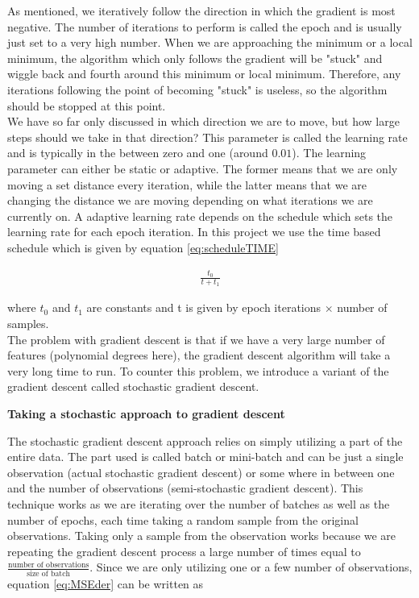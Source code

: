 \documentclass[12pt,a4paper]{article}
\begin{document}
\noindent As mentioned, we iteratively follow the direction in which the gradient is most negative. The number of iterations to perform is called the epoch and is usually just set to a very high number. When we are approaching the minimum or a local minimum, the algorithm which only follows the gradient will be "stuck" and wiggle back and fourth around this minimum or local minimum. Therefore, any iterations following the point of becoming "stuck" is useless, so the algorithm should be stopped at this point.
\\
We have so far only discussed in which direction we are to move, but how large steps should we take in that direction? This parameter is called the learning rate and is typically in the between zero and one (around $0.01$). The learning parameter can either be static or adaptive. The former means that we are only moving a set distance every iteration, while the latter means that we are changing the distance we are moving depending on what iterations we are currently on. A adaptive learning rate depends on the schedule which sets the learning rate for each epoch iteration. In this project we use the time based schedule which is given by equation \ref{eq:scheduleTIME}

\begin{equation}\label{eq:scheduleTIME}
\begin{aligned}
\frac{t_0}{t + t_1}
\end{aligned}
\end{equation}

\noindent where $t_0$ and $t_1$ are constants and t is given by epoch iterations $\times$ number of samples. 
\\
The problem with gradient descent is that if we have a very large number of features (polynomial degrees here), the gradient descent algorithm will take a very long time to run. To counter this problem, we introduce a variant of the gradient descent called stochastic gradient descent.

\begin{center}
\large{\textbf{Taking a stochastic approach to gradient descent}}
\end{center}

\noindent The stochastic gradient descent approach relies on simply utilizing a part of the entire data. The part used is called batch or mini-batch and can be just a single observation (actual stochastic gradient descent) or some where in between one and the number of observations (semi-stochastic gradient descent). This technique works as we are iterating over the number of batches as well as the number of epochs, each time taking a random sample from the original observations. Taking only a sample from the observation works because we are repeating the gradient descent process a large number of times equal to $\frac{\textrm{number of observations}}{\textrm{size of batch}}$. Since we are only utilizing one or a few number of observations, equation \ref{eq:MSEder} can be written as
\end{document}
